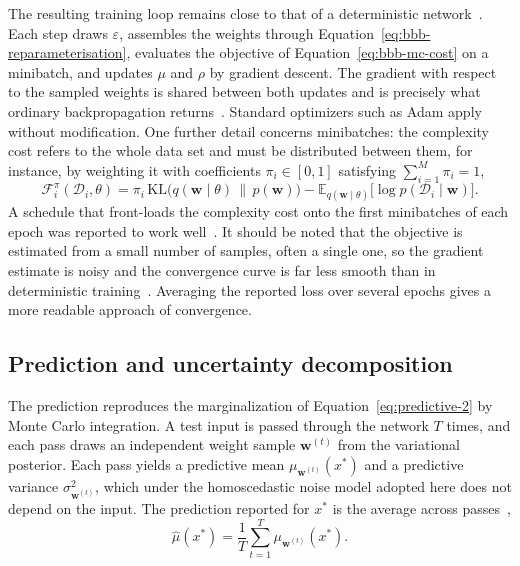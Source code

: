 The resulting training loop remains close to that of a deterministic
network~\cite{jospin2022}. Each step draws $\varepsilon$, assembles the weights
through Equation~\eqref{eq:bbb-reparameterisation}, evaluates the objective of
Equation~\eqref{eq:bbb-mc-cost} on a minibatch, and updates $\mu$ and $\rho$ by
gradient descent. The gradient with respect to the sampled weights is shared between
both updates and is precisely what ordinary backpropagation returns~\cite{blundell2015}.
Standard optimizers such as Adam apply without modification. One further detail
concerns minibatches: the complexity cost refers to the whole data set and must be
distributed between them, for instance, by weighting it with coefficients
$\pi_i \in [0,1]$ satisfying $\sum_{i=1}^{M} \pi_i = 1$,
%
\begin{equation}
    \mathcal{F}_i^{\pi}(\mathcal{D}_i, \theta)
    = \pi_i\, \mathrm{KL}\bigl(q(\mathbf{w} \mid \theta) \,\|\, p(\mathbf{w})\bigr)
      - \mathbb{E}_{q(\mathbf{w} \mid \theta)}
        \bigl[\log p(\mathcal{D}_i \mid \mathbf{w})\bigr] .
    \label{eq:bbb-kl-reweighting}
\end{equation}
%
A schedule that front-loads the complexity cost onto the first minibatches of each
epoch was reported to work well~\cite{blundell2015}. It should be noted that the
objective is estimated from a small number of samples, often a single one, so the
gradient estimate is noisy and the convergence curve is far less smooth than in
deterministic training~\cite{jospin2022}. Averaging the reported loss over several
epochs gives a more readable approach of convergence.

\subsection{Prediction and uncertainty decomposition}
\label{subsec:bbb-prediction}

The prediction reproduces the marginalization of Equation~\eqref{eq:predictive-2} by
Monte Carlo integration. A test input is passed through the network $T$ times, and
each pass draws an independent weight sample $\mathbf{w}^{(t)}$ from the variational
posterior. 
Each pass yields a predictive mean $\mu_{\mathbf{w}^{(t)}}(x^\ast)$ and a
predictive variance $\sigma^2_{\mathbf{w}^{(t)}}$, which under the homoscedastic
noise model adopted here does not depend on the input. The prediction reported for $x^\ast$ is the
average across passes~\cite{jospin2022},
%
\begin{equation}
    \hat{\mu}(x^\ast)
    = \frac{1}{T} \sum_{t=1}^{T} \mu_{\mathbf{w}^{(t)}}(x^\ast) .
    \label{eq:bbb-predictive-mean}
\end{equation}

